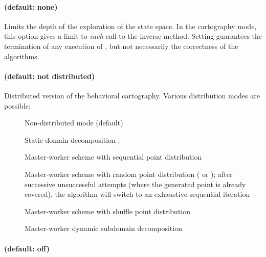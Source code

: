 \paragraph{ (default: none)}
Limits the depth of the exploration of the state space.
In the cartography mode, this option gives a limit to \emph{each} call to the inverse method.
Setting  guarantees the termination of any execution of \imitator{}, but not necessarily the correctness of the algorithms.


\paragraph{ (default: not distributed)}
Distributed version of the behavioral cartography.
Various distribution modes are possible:

\begin{description}
	\item[] Non-distributed mode (default)
	\item[] Static domain decomposition \cite{ACN15}; %
	\item[] Master-worker scheme with sequential point distribution \cite{ACE14}
	\item[] Master-worker scheme with random point distribution (\eg{}  or ); after  successive unsuccessful attempts (where the generated point is already covered), the algorithm will switch to an exhaustive sequential iteration \cite{ACE14}
	\item[] Master-worker scheme with shuffle point distribution \cite{ACN15}
	\item[] Master-worker dynamic subdomain decomposition \cite{ACN15}
\end{description}





\paragraph{ (default: off)}

